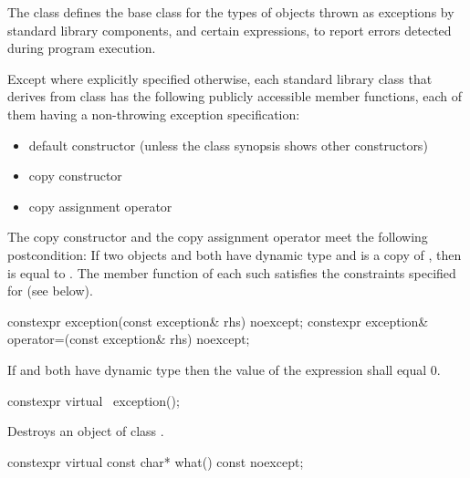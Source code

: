\pnum
The class
defines the base
class for the types of objects thrown as exceptions by
\Cpp{} standard library components, and certain
expressions, to report errors detected during program execution.

\pnum
Except where explicitly specified otherwise,
each standard library class  that derives from class 
has the following publicly accessible member functions, each of them having
a non-throwing exception specification:
\begin{itemize}
\item default constructor (unless the class synopsis shows other constructors)
\item copy constructor
\item copy assignment operator
\end{itemize}
The copy constructor and the copy assignment operator meet
the following postcondition: If two objects  and  both have
dynamic type  and  is a copy of , then
 is equal to .
The  member function of each such  satisfies the
constraints specified for  (see below).

%
%
\begin{itemdecl}
constexpr exception(const exception& rhs) noexcept;
constexpr exception& operator=(const exception& rhs) noexcept;
\end{itemdecl}

\begin{itemdescr}
\pnum
\ensures
If  and  both have dynamic type 
then the value of the expression  shall equal 0.
\end{itemdescr}

%
\begin{itemdecl}
constexpr virtual ~exception();
\end{itemdecl}

\begin{itemdescr}
\pnum
\effects
Destroys an object of class
.
\end{itemdescr}

%
\begin{itemdecl}
constexpr virtual const char* what() const noexcept;
\end{itemdecl}

